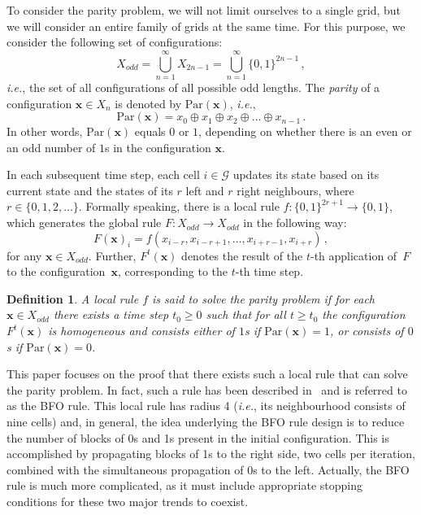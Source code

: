 \documentclass{sn-jnl}
\newtheorem{defn}{Definition}%
\newcommand{\xodd}{X_{odd}}
\newcommand{\bx}{\mathbf{x}}
\newcommand{\G}{\mathcal{G} }
\begin{document}
To consider the parity problem, we will not limit ourselves to a single grid, but we will consider an entire family of grids at the same time. For this purpose, we consider the following set of configurations:
\[
\xodd=\bigcup_{n=1}^\infty X_{2n-1} = \bigcup_{n=1}^\infty \{0,1\}^{2n-1}\, ,
\]
\emph{i.e.}, the set of all configurations of all possible odd lengths.
The \emph{parity} of a configuration $\bx\in X_n$ is denoted by 
$\mathrm{Par}(\bx)$, \emph{i.e.},
\[
\mathrm{Par}(\bx) = x_0\oplus x_1\oplus x_2\oplus \ldots\oplus x_{n-1}\, .
\]
In other words, $\mathrm{Par}(\bx)$ equals $0$ or $1$, depending on whether there is an even or an odd number of $1$s in the configuration $\bx$.

In each subsequent time step, each cell $i\in\G$ updates its state based on its current state and the states of its $r$ left and $r$ right neighbours, where $r \in \{0,1,2,\ldots\}$. 
Formally speaking, there is a local rule $f:\{0,1\}^{2r+1}\to \{0,1\}$, which generates the global rule $F : \xodd \to \xodd$ in the following way:
\[
F(\bx)_i = f(x_{i-r},x_{i-r+1}, \dots, x_{i+r-1}, x_{i+r})\,,
\]
for any $\bx\in \xodd$.
Further, $F^t(\bx)$ denotes the result of the $t$-th application of~$F$ to the configuration~$\bx$, corresponding to the $t$-th time step.

\begin{defn}
A local rule $f$ is said to solve the parity problem if for each  $\bx\in \xodd$ there exists a time step $t_0\geq 0$ such that for all $t\geq t_0$ the configuration $F^t(\bx)$ is homogeneous and consists either of $1$s if $\mathrm{Par}(\bx)=1$, or consists of $0$s if $\mathrm{Par}(\bx)=0$.
\end{defn}

This paper focuses on the proof that there exists such a local rule that can solve the parity problem. In fact, such a rule has been described in~\cite{BFO2013} and is referred to as the BFO rule. This local rule has radius 4 (\emph{i.e.}, its neighbourhood consists of nine cells) and, in general, the idea underlying the BFO rule design is to reduce the number of blocks of 0s and 1s present in the initial configuration. This is accomplished by propagating blocks of 1s to the right side, two cells per iteration, combined with the simultaneous propagation of 0s to the left. Actually, the BFO rule is much more complicated, as it must include appropriate stopping conditions for these two major trends to coexist. 
\end{document}
